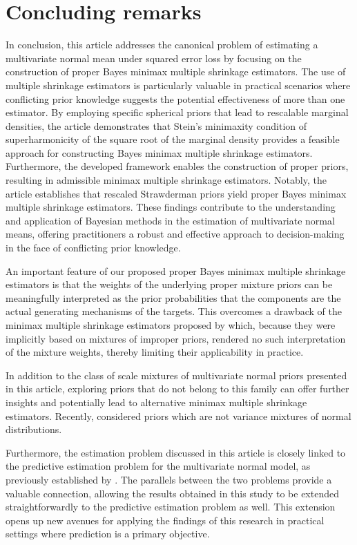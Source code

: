 \documentclass[11pt]{article}
\theoremstyle{definition}
\begin{document}
\section{Concluding remarks}
In conclusion, this article addresses the canonical problem of estimating a multivariate normal mean under squared error loss by focusing on the construction of proper Bayes minimax multiple shrinkage estimators. The use of multiple shrinkage estimators is particularly valuable in practical scenarios where conflicting prior knowledge suggests the potential effectiveness of more than one estimator. By employing specific spherical priors that lead to rescalable marginal densities, the article demonstrates that Stein's minimaxity condition of superharmonicity of the square root of the marginal density provides a feasible approach for constructing Bayes minimax multiple shrinkage estimators. Furthermore, the developed framework enables the construction of proper priors, resulting in admissible minimax multiple shrinkage estimators. Notably, the article establishes that rescaled Strawderman priors yield proper Bayes minimax multiple shrinkage estimators. These findings contribute to the understanding and application of Bayesian methods in the estimation of multivariate normal means, offering practitioners a robust and effective approach to decision-making in the face of conflicting prior knowledge.

An important feature of our proposed proper Bayes minimax multiple shrinkage estimators is that the weights of the underlying proper mixture priors can be meaningfully interpreted as the prior probabilities that the components are the actual generating mechanisms of the targets. This overcomes a drawback of the minimax multiple shrinkage estimators proposed by \cite{george1986a} which, because they were implicitly based on mixtures of improper priors, rendered no such interpretation of the mixture weights, thereby limiting their applicability in practice.

In addition to the class of scale mixtures of multivariate normal priors presented in this article, exploring priors that do not belong to this family can offer further insights and potentially lead to alternative minimax multiple shrinkage estimators. Recently, \cite{fourdrinier2023priors} considered priors which are not variance mixtures of normal distributions. 

Furthermore, the estimation problem discussed in this article is closely linked to the predictive estimation problem for the multivariate normal model, as previously established by \cite{glx2006}. The parallels between the two problems provide a valuable connection, allowing the results obtained in this study to be extended straightforwardly to the predictive estimation problem as well. This extension opens up new avenues for applying the findings of this research in practical settings where prediction is a primary objective.
\end{document}
